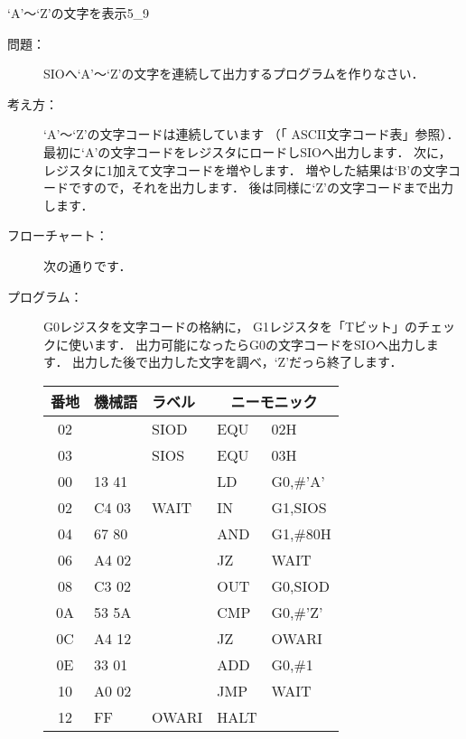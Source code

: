 \newpage
\begin{reidai}{`A'〜`Z'の文字を表示}{5_9}
  \begin{description}
  \item[問題：] SIOへ`A'〜`Z'の文字を連続して出力するプログラムを作りなさい．

  \item[考え方：]
    `A'〜`Z'の文字コードは連続しています
    （「 ASCII文字コード表」参照）．
    最初に`A'の文字コードをレジスタにロードしSIOへ出力します．
    次に，レジスタに1加えて文字コードを増やします．
    増やした結果は`B'の文字コードですので，それを出力します．
    後は同様に`Z'の文字コードまで出力します．

  \item[フローチャート：]
    次の通りです．

    \begin{center}
    \end{center}

  \item[プログラム：]
    G0レジスタを文字コードの格納に，
    G1レジスタを「Tビット」のチェックに使います．
    出力可能になったらG0の文字コードをSIOへ出力します．
    出力した後で出力した文字を調べ，`Z'だっら終了します．

    {\ttfamily\footnotesize\begin{center}
      \begin{tabular}{|c|l|l|l l|} \hline
        番地 & 機械語 & ラベル & \multicolumn{2}{|c|}{ニーモニック} \\
        \hline
        02 &       & SIOD  & EQU  & 02H             \\
        03 &       & SIOS  & EQU  & 03H             \\
        00 & 13 41 &       & LD   & G0,\#'A'        \\
        02 & C4 03 & WAIT  & IN   & G1,SIOS         \\
        04 & 67 80 &       & AND  & G1,\#80H        \\
        06 & A4 02 &       & JZ   & WAIT            \\
        08 & C3 02 &       & OUT  & G0,SIOD         \\
        0A & 53 5A &       & CMP  & G0,\#'Z'        \\
        0C & A4 12 &       & JZ   & OWARI           \\
        0E & 33 01 &       & ADD  & G0,\#1          \\
        10 & A0 02 &       & JMP  & WAIT            \\
        12 & FF    & OWARI & HALT &                 \\
        \hline
      \end{tabular}
    \end{center}}
  \end{description}
\end{reidai}

